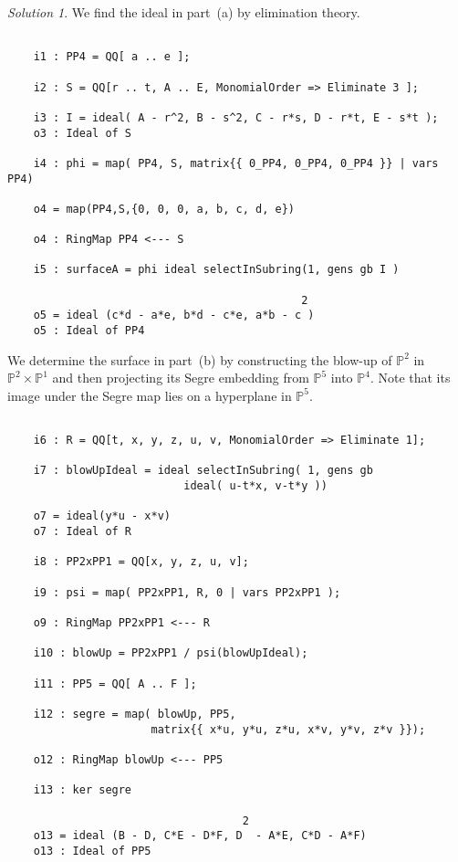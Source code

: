 \documentclass[12pt,noamsfonts]{amsart}
\def\PP{{\mathbb P}}
\theoremstyle{definition}
\theoremstyle{remark}
\newtheorem*{solution}{Solution}
\begin{document}
\begin{solution}
We find the ideal in part~(a) by elimination theory.
{\scriptsize
\begin{verbatim}

    i1 : PP4 = QQ[ a .. e ];

    i2 : S = QQ[r .. t, A .. E, MonomialOrder => Eliminate 3 ];
    
    i3 : I = ideal( A - r^2, B - s^2, C - r*s, D - r*t, E - s*t );
    o3 : Ideal of S
    
    i4 : phi = map( PP4, S, matrix{{ 0_PP4, 0_PP4, 0_PP4 }} | vars PP4)
    
    o4 = map(PP4,S,{0, 0, 0, a, b, c, d, e})
    
    o4 : RingMap PP4 <--- S
    
    i5 : surfaceA = phi ideal selectInSubring(1, gens gb I )
    
                                             2
    o5 = ideal (c*d - a*e, b*d - c*e, a*b - c )
    o5 : Ideal of PP4

\end{verbatim}}
\noindent We determine the surface in part~(b) by constructing the
blow-up of $\PP^{2}$ in $\PP^{2} \times \PP^{1}$ and then projecting
its Segre embedding from $\PP^{5}$ into $\PP^{4}$.  Note that its
image under the Segre map lies on a hyperplane in $\PP^{5}$.
{\scriptsize
\begin{verbatim}

    i6 : R = QQ[t, x, y, z, u, v, MonomialOrder => Eliminate 1];
    
    i7 : blowUpIdeal = ideal selectInSubring( 1, gens gb 
                           ideal( u-t*x, v-t*y ))
    
    o7 = ideal(y*u - x*v)
    o7 : Ideal of R
    
    i8 : PP2xPP1 = QQ[x, y, z, u, v];
    
    i9 : psi = map( PP2xPP1, R, 0 | vars PP2xPP1 );
    
    o9 : RingMap PP2xPP1 <--- R
    
    i10 : blowUp = PP2xPP1 / psi(blowUpIdeal);
    
    i11 : PP5 = QQ[ A .. F ];
    
    i12 : segre = map( blowUp, PP5, 
                      matrix{{ x*u, y*u, z*u, x*v, y*v, z*v }});
    
    o12 : RingMap blowUp <--- PP5
    
    i13 : ker segre
    
                                    2
    o13 = ideal (B - D, C*E - D*F, D  - A*E, C*D - A*F)
    o13 : Ideal of PP5
    

\end{verbatim}}
\end{solution}
\end{document}
